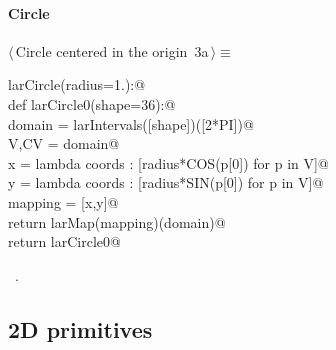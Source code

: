 \documentclass[11pt,oneside]{article}	%
\begin{document}
\paragraph{Circle}
\begin{flushleft} \small \label{scrap5}
\protect{}$\langle\,$Circle centered in the origin\nobreak\ {\footnotesize 3a}$\,\rangle\equiv$
\vspace{-1ex}
\begin{list}{}{} \item
\mbox{}\verb@def larCircle(radius=1.):@\\
\mbox{}\verb@   def larCircle0(shape=36):@\\
\mbox{}\verb@      domain = larIntervals([shape])([2*PI])@\\
\mbox{}\verb@      V,CV = domain@\\
\mbox{}\verb@      x = lambda coords : [radius*COS(p[0]) for p in V]@\\
\mbox{}\verb@      y = lambda coords : [radius*SIN(p[0]) for p in V]@\\
\mbox{}\verb@      mapping = [x,y]@\\
\mbox{}\verb@      return larMap(mapping)(domain)@\\
\mbox{}\verb@   return larCircle0@\\
\mbox{}\verb@@{\NWsep}
\end{list}
\vspace{-1ex}
\footnotesize\addtolength{\baselineskip}{-1ex}
\begin{list}{}{\setlength{\itemsep}{-\parsep}\setlength{\itemindent}{-\leftmargin}}
\item \NWtxtMacroRefIn\ .
\end{list}
\end{flushleft}
\subsection{2D primitives}
\end{document}
